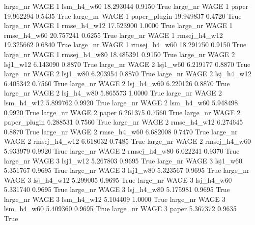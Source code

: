  large_nr     WAGE                 1   lsm_h4_w60   18.293044      0.9150    True
  large_nr     WAGE                 1        paper   19.962294      0.5435    True
  large_nr     WAGE                 1 paper_plugin   19.949837      0.4720    True
  large_nr     WAGE                 1  rmse_h4_w12   17.523900      1.0000    True
  large_nr     WAGE                 1  rmse_h4_w60   20.757241      0.6255    True
  large_nr     WAGE                 1 rmsej_h4_w12   19.325662      0.6840    True
  large_nr     WAGE                 1 rmsej_h4_w60   18.291750      0.9150    True
  large_nr     WAGE                 1 rmsej_h4_w80   18.485391      0.9150    True
  large_nr     WAGE                 2     lsj1_w12    6.143090      0.8870    True
  large_nr     WAGE                 2     lsj1_w60    6.219177      0.8870    True
  large_nr     WAGE                 2     lsj1_w80    6.203954      0.8870    True
  large_nr     WAGE                 2   lsj_h4_w12    6.405342      0.7560    True
  large_nr     WAGE                 2   lsj_h4_w60    6.220126      0.8870    True
  large_nr     WAGE                 2   lsj_h4_w80    5.865573      1.0000    True
  large_nr     WAGE                 2   lsm_h4_w12    5.899762      0.9920    True
  large_nr     WAGE                 2   lsm_h4_w60    5.948498      0.9920    True
  large_nr     WAGE                 2        paper    6.261375      0.7560    True
  large_nr     WAGE                 2 paper_plugin    6.288531      0.7560    True
  large_nr     WAGE                 2  rmse_h4_w12    6.274645      0.8870    True
  large_nr     WAGE                 2  rmse_h4_w60    6.682008      0.7470    True
  large_nr     WAGE                 2 rmsej_h4_w12    6.618032      0.7485    True
  large_nr     WAGE                 2 rmsej_h4_w60    5.933979      0.9920    True
  large_nr     WAGE                 2 rmsej_h4_w80    6.022241      0.9370    True
  large_nr     WAGE                 3     lsj1_w12    5.267803      0.9695    True
  large_nr     WAGE                 3     lsj1_w60    5.351767      0.9695    True
  large_nr     WAGE                 3     lsj1_w80    5.323567      0.9695    True
  large_nr     WAGE                 3   lsj_h4_w12    5.299005      0.9695    True
  large_nr     WAGE                 3   lsj_h4_w60    5.331740      0.9695    True
  large_nr     WAGE                 3   lsj_h4_w80    5.175981      0.9695    True
  large_nr     WAGE                 3   lsm_h4_w12    5.104409      1.0000    True
  large_nr     WAGE                 3   lsm_h4_w60    5.409360      0.9695    True
  large_nr     WAGE                 3        paper    5.367372      0.9635    True
